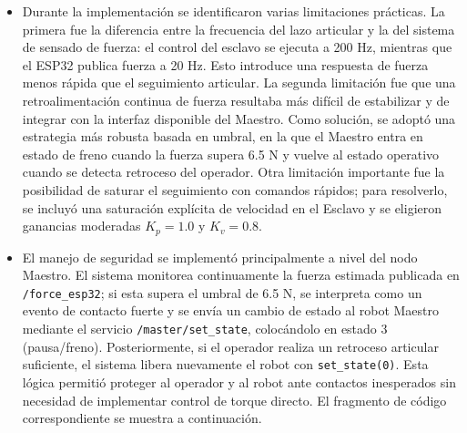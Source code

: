 \documentclass[journal,10pt,twoside]{IEEEtran}
\begin{document}
\begin{itemize}
    \item Durante la implementación se identificaron varias limitaciones prácticas. La primera fue la diferencia entre la frecuencia del lazo articular y la del sistema de sensado de fuerza: el control del esclavo se ejecuta a 200 Hz, mientras que el ESP32 publica fuerza a 20 Hz. Esto introduce una respuesta de fuerza menos rápida que el seguimiento articular. La segunda limitación fue que una retroalimentación continua de fuerza resultaba más difícil de estabilizar y de integrar con la interfaz disponible del Maestro. Como solución, se adoptó una estrategia más robusta basada en umbral, en la que el Maestro entra en estado de freno cuando la fuerza supera 6.5 N y vuelve al estado operativo cuando se detecta retroceso del operador. Otra limitación importante fue la posibilidad de saturar el seguimiento con comandos rápidos; para resolverlo, se incluyó una saturación explícita de velocidad en el Esclavo y se eligieron ganancias moderadas \(K_p=1.0\) y \(K_v=0.8\).
    \\

    \item El manejo de seguridad se implementó principalmente a nivel del nodo Maestro. El sistema monitorea continuamente la fuerza estimada publicada en \texttt{/force\_esp32}; si esta supera el umbral de 6.5 N, se interpreta como un evento de contacto fuerte y se envía un cambio de estado al robot Maestro mediante el servicio \texttt{/master/set\_state}, colocándolo en estado 3 (pausa/freno). Posteriormente, si el operador realiza un retroceso articular suficiente, el sistema libera nuevamente el robot con \texttt{set\_state(0)}. Esta lógica permitió proteger al operador y al robot ante contactos inesperados sin necesidad de implementar control de torque directo. El fragmento de código correspondiente se muestra a continuación.
\end{itemize}
\end{document}
